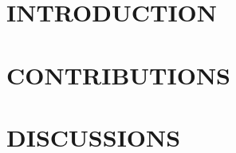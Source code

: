\documentclass[colophon-location=nowhere]{yathesis}
\begin{document}
%
% 
%
%
\part{INTRODUCTION}
%

%

%

%
%
\part{CONTRIBUTIONS}
%

%

%

%


\part{DISCUSSIONS}

%
%
%
\printbibliography
%
\appendix
%

%
% 
%
%
%
%
%
\makebackcover
%
\end{document}
